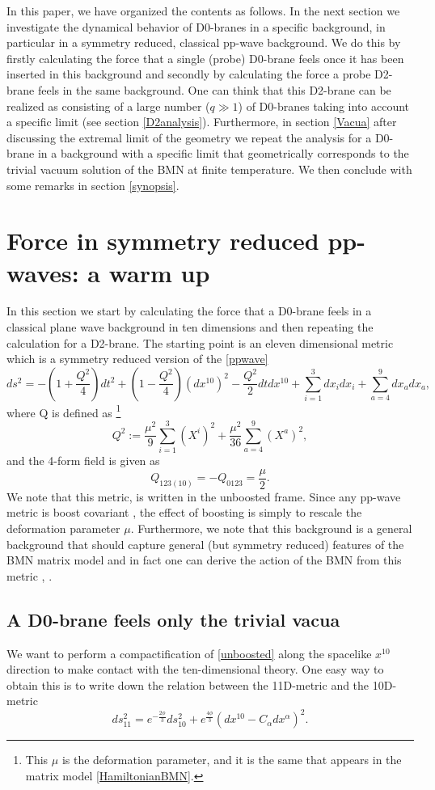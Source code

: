\documentclass[11pt,english]{article}
\newcommand{\be}{\begin{equation}}
\newcommand{\ee}{\end{equation}}
\numberwithin{equation}{section}
\begin{document}
In this paper, we have organized the contents as follows. In the next section we investigate the dynamical behavior of D0-branes in a specific background, in particular in a symmetry reduced, classical pp-wave background. We do this by firstly calculating the force that a single (probe) D0-brane feels once it has been inserted in this background and secondly by calculating the force a probe D2-brane feels in the same background. One can think that this D2-brane can be realized as consisting of a large number ($q\gg 1$) of D0-branes taking into account a specific limit (see section \ref{D2analysis}). Furthermore, in section \ref{Vacua} after discussing the extremal limit of the geometry we repeat the analysis for a D0-brane in a background with a specific limit that geometrically corresponds to the trivial vacuum solution of the BMN at finite temperature. We then conclude with some remarks in section \ref{synopsis}.


\section{Force in symmetry reduced pp-waves: a warm up}\label{classicalforce}
In this section we start by calculating the force that a D0-brane feels in a classical plane wave background in ten dimensions and then repeating the calculation for a D2-brane. The starting point is  an eleven dimensional metric which is a symmetry reduced version of the \eqref{ppwave}
\be \label{unboosted}
ds^2=-(1+\frac{Q^2}{4})dt^2+(1-\frac{Q^2}{4})(dx^{10})^2-\frac{Q^2}{2}dtdx^{10}+\sum_{i=1}^{3}dx_idx_i+\sum_{a=4}^9dx_adx_a,
\ee 
where Q is defined as \footnote{This $\mu$ is the deformation parameter, and it is the same that appears in the matrix model \eqref{HamiltonianBMN}.}
\be \label{Fdefin}
Q^2:=\frac{\mu^2}{9}\sum_{i=1}^3(X^i)^2+\frac{\mu^2}{36}\sum_{a=4}^9(X^a)^2,
\ee
 and the 4-form field is given as 
\be 
Q_{123(10)}=-Q_{0123}=\frac{\mu }{2}.
\ee
We note that this metric, is written in the unboosted frame. Since any pp-wave metric is boost covariant \cite{Blau2004}, the effect of boosting is simply to rescale the deformation parameter $\mu$.  Furthermore, we note that this background is a general background that should capture general (but symmetry reduced) features of the BMN matrix model and in fact one can derive the action of the BMN from this metric \cite{Dasgupta2002}, \cite{TaylorIV1999}.

\subsection{A D0-brane feels only the trivial vacua}\label{D0reduced}
We want to perform a compactification of \eqref{unboosted} along the  spacelike $x^{10}$ direction to make contact with the ten-dimensional theory. One easy way to obtain this is to write down the relation between the 11D-metric and the 10D-metric
\be 
ds^2_{11}=e^{-\frac{2\phi}{3}}ds_{10}^2+e^{\frac{4\phi}{3}}\left(dx^{10}-C_\alpha dx^\alpha\right)^2.
\ee
\end{document}
